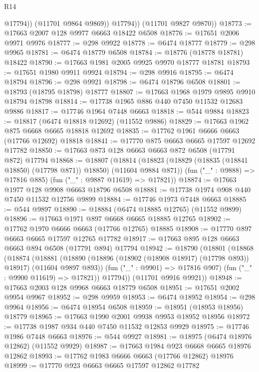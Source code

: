 \begin{lexlean}{R14}
\begin{coremodule}
{{{{{{{{{{{{{{{{{{{{{{{{{{{{{{{{{{{{{{{{{{{{{{{{{{{{{{{{{{{{{{{{{{{{{{{{{{{{{{{{{{                @17794))
            (@11701 @9864 @9869))
          @17794))
      (@11701 @9827 @9870))
@18773 := @17663 @2007 @128 @9977 @6663 @18422 @6508
@18776 := @17651 @2006 @9971 @9976
@18777 := @298 @9922
@18778 := @6474 @18777
@18779 := @298 @9965
@18781 := @6474 @18779 @6508
@18784 := @18776 (@18778 @18781) @18422
@18790 := @17663 @1981 @2005 @9925 @9970 @18777 @18781
@18793 := @17651 @1980 @9911 @9924
@18794 := @298 @9916
@18795 := @6474 @18794
@18796 := @298 @9921
@18798 := @6474 @18796 @6508
@18801 := @18793 (@18795 @18798) @18777
@18807 := @17663 @1968 @1979 @9895 @9910 @18794 @18798
@18814 := @17738 @1965 @886 @440 @7450 @11532 @12683 @9886
@18817 := @17746 @1964 @7448 @6663
@18818 := @544 @9884
@18823 := @18817 (@6474 @18818 @12692) (@11552 @9886)
@18829 := @17663 @1962 @875 @6668 @6665 @18818 @12692
@18835 := @17762 @1961 @6666 @6663 (@17766 @12692) @18818
@18841 := @17770 @875 @6663 @6665 @17597 @12692 @17782
@18850 := @17663 @873 @128 @6663 @6663 @872 @6508 (@17791 @872) @17794
@18868 := @18807
    (@18814
      (@18823 (@18829 (@18835 (@18841 @18850) (@17798 @871)) @18850) (@11604 @9884 @871))
      (fun ("_" : @9888) => @17816 @885)
      (fun ("_" : @9887 @11619) => @17821))
@18874 := @17663 @1977 @128 @9908 @6663 @18796 @6508
@18881 := @17738 @1974 @908 @440 @7450 @11532 @12756 @9899
@18884 := @17746 @1973 @7448 @6663
@18885 := @544 @9897
@18890 := @18884 (@6474 @18885 @12765) (@11552 @9899)
@18896 := @17663 @1971 @897 @6668 @6665 @18885 @12765
@18902 := @17762 @1970 @6666 @6663 (@17766 @12765) @18885
@18908 := @17770 @897 @6663 @6665 @17597 @12765 @17782
@18917 := @17663 @895 @128 @6663 @6663 @894 @6508 (@17791 @894) @17794
@18942 := @18790
    (@18801
      (@18868
        (@18874
          (@18881
            (@18890 (@18896 (@18902 (@18908 @18917) (@17798 @893)) @18917) (@11604 @9897 @893))
            (fun ("_" : @9901) => @17816 @907)
            (fun ("_" : @9900 @11619) => @17821))
          @17794))
      (@11701 @9916 @9921))
@18948 := @17663 @2003 @128 @9968 @6663 @18779 @6508
@18951 := @17651 @2002 @9954 @9967
@18952 := @298 @9959
@18953 := @6474 @18952
@18954 := @298 @9964
@18956 := @6474 @18954 @6508
@18959 := @18951 (@18953 @18956) @18779
@18965 := @17663 @1990 @2001 @9938 @9953 @18952 @18956
@18972 := @17738 @1987 @934 @440 @7450 @11532 @12853 @9929
@18975 := @17746 @1986 @7448 @6663
@18976 := @544 @9927
@18981 := @18975 (@6474 @18976 @12862) (@11552 @9929)
@18987 := @17663 @1984 @923 @6668 @6665 @18976 @12862
@18993 := @17762 @1983 @6666 @6663 (@17766 @12862) @18976
@18999 := @17770 @923 @6663 @6665 @17597 @12862 @17782
}}}}}}}}}}}}}}}}}}}}}}}}}}}}}}}}}}}}}}}}}}}}}}}}}}}}}}}}}}}}}}}}}}}}}}}}}}}}}}}}}}
\end{coremodule}
\end{lexlean}
